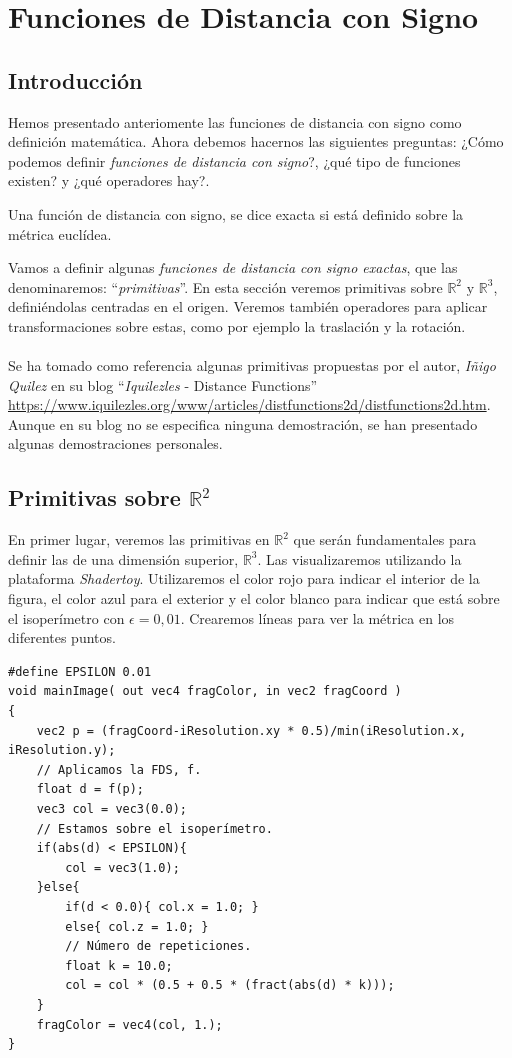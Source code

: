 \chapter{Funciones de Distancia con Signo}
\section{Introducción}
Hemos presentado anteriomente las funciones de distancia con signo como definición matemática. Ahora debemos hacernos las siguientes preguntas: ¿Cómo podemos definir \textit{funciones de distancia con signo}?, ¿qué tipo de funciones existen? y ¿qué operadores hay?.

\begin{definition}
Una función de distancia con signo, se dice exacta si está definido sobre la métrica euclídea.
\end{definition}

Vamos a definir algunas \textit{funciones de distancia con signo exactas}, que las denominaremos: \enquote{\textit{primitivas}}. En esta sección veremos primitivas sobre \(\mathbb{R}^2 \text{ y }\mathbb{R}^3\), definiéndolas centradas en el origen. Veremos también operadores para aplicar transformaciones sobre estas, como por ejemplo la traslación y la rotación.\\\\
Se ha tomado como referencia algunas primitivas propuestas por el autor, \textit{Iñigo Quilez} en su blog \enquote{\textit{Iquilezles} - Distance Functions} \url{https://www.iquilezles.org/www/articles/distfunctions2d/distfunctions2d.htm}. Aunque en su blog no se especifica ninguna demostración, se han presentado algunas demostraciones personales.

\section{Primitivas sobre \(\mathbb{R}^2\)}
En primer lugar, veremos las primitivas en \(\mathbb{R}^2\) que serán fundamentales para definir las de una dimensión superior, \(\mathbb{R}^3\). Las visualizaremos utilizando la plataforma \textit{Shadertoy}. Utilizaremos el color rojo para indicar el interior de la figura, el color azul para el exterior y el color blanco para indicar que está sobre el isoperímetro con \(\epsilon=0,01\). Crearemos líneas para ver la métrica en los diferentes puntos.
\begin{lstlisting}
#define EPSILON 0.01
void mainImage( out vec4 fragColor, in vec2 fragCoord )
{
    vec2 p = (fragCoord-iResolution.xy * 0.5)/min(iResolution.x, iResolution.y);
    // Aplicamos la FDS, f.
    float d = f(p);
    vec3 col = vec3(0.0);
    // Estamos sobre el isoperímetro.
    if(abs(d) < EPSILON){
        col = vec3(1.0);
    }else{
        if(d < 0.0){ col.x = 1.0; }
        else{ col.z = 1.0; }
    	// Número de repeticiones.
        float k = 10.0;
        col = col * (0.5 + 0.5 * (fract(abs(d) * k)));
    }
    fragColor = vec4(col, 1.);
}
\end{lstlisting}

